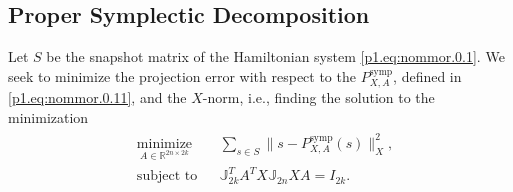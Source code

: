 \subsection{Proper Symplectic Decomposition} \label{sec:normmor.1.1}
Let $S$ be the snapshot matrix of the Hamiltonian system \eqref{p1.eq:nommor.0.1}. We seek to minimize the projection error with respect to the $P_{X,A}^{\text{symp}}$, defined in \eqref{p1.eq:nommor.0.11}, and the $X$-norm, i.e., finding the solution to the minimization
\begin{eqnarray} \label{eq:normmor.3}
\begin{aligned}
& \underset{A\in \mathbb{R}^{2n\times 2k}}{\text{minimize}}
& & \sum_{s\in S} \| s - P_{X,A}^{\text{symp}}(s) \|_X^2, \\
& \text{subject to}
& & \mathbb J_{2k}^T A^T X \mathbb J_{2n} X A = I_{2k}.
\end{aligned}
\end{eqnarray}

